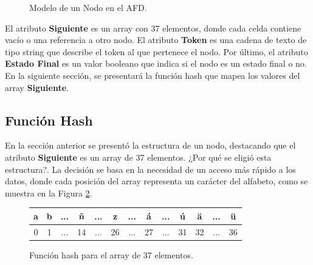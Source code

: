 \documentclass[10pt,times,twocolumn]{article}
\begin{document}
\begin{figure}[H]
	\caption{Modelo de un Nodo en el AFD.}
	\label{fig:estructura_nodo}
\end{figure}

El atributo \textbf{Siguiente} es un array con 37 elementos, donde cada celda contiene vacío o una referencia a otro nodo. El atributo \textbf{Token} es una cadena de texto de tipo string que describe el token al que pertenece el nodo. Por último, el atributo \textbf{Estado Final} es un valor booleano que indica si el nodo es un estado final o no. En la siguiente sección, se presentará la función hash que mapea los valores del array \textbf{Siguiente}.

\subsection{Función Hash}
En la sección anterior se presentó la estructura de un nodo, destacando que el atributo \textbf{Siguiente} es un array de 37 elementos. ¿Por qué se eligió esta estructura?. La decisión se basa en la necesidad de un acceso más rápido a los datos, donde cada posición del array representa un carácter del alfabeto, como se muestra en la Figura \ref{fig:funcion_hash}.

\begin{figure}[H]
	\begin{tabular}{|c|c|c|c|c|c|c|c|c|c|c|c|c|}
  		\hline
		a & b & ... & ñ & ... & z & ... & á & ... & ú & ä & ... & ü \\
  		\hline
  		0 & 1 & ... & 14 & ... & 26 & ... & 27 & ... & 	31 & 32 & ... & 36 \\
  		\hline
	\end{tabular}
	\caption{Función hash para el array de 37 elementos.}
	\label{fig:funcion_hash}
\end{figure}
\end{document}
